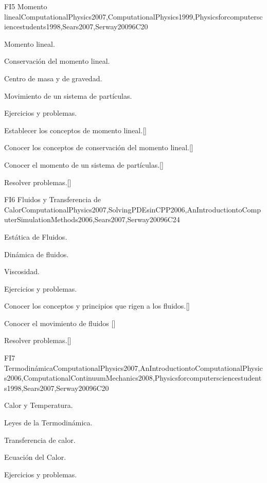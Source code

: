 \begin{syllabus}
\begin{unit}{}{FI5 Momento lineal}{ComputationalPhysics2007,ComputationalPhysics1999,Physicsforcomputersciencestudents1998,Sears2007,Serway2009}{6}{C20}
\begin{topics}
      \item Momento lineal.
      \item Conservación del momento lineal.
      \item Centro de masa y de gravedad.
      \item Movimiento de un sistema de partículas.
      \item Ejercicios y problemas.
  \end{topics}

   \begin{learningoutcomes}
      \item Establecer los conceptos de momento lineal.[\Usage]
      \item Conocer los conceptos de conservación del momento lineal.[\Usage]
      \item Conocer el momento de un sistema de partículas.[\Usage]
      \item Resolver problemas.[\Usage]
   \end{learningoutcomes}
\end{unit}

\begin{unit}{}{FI6 Fluidos y Transferencia de Calor}{ComputationalPhysics2007,SolvingPDEsinCPP2006,AnIntroductiontoComputerSimulationMethods2006,Sears2007,Serway2009}{6}{C24}
\begin{topics}
      \item Estática de Fluidos.
      \item Dinámica de fluidos. 
      \item Viscosidad.
      \item Ejercicios y problemas.
  \end{topics}

   \begin{learningoutcomes}
      \item Conocer los conceptos y principios que rigen a los fluidos.[\Usage]
      \item Conocer el movimiento de fluidos [\Usage]
      \item Resolver problemas.[\Usage]
   \end{learningoutcomes}
\end{unit}

\begin{unit}{}{FI7 Termodinámica}{ComputationalPhysics2007,AnIntroductiontoComputationalPhysics2006,ComputationalContinuumMechanics2008,Physicsforcomputersciencestudents1998,Sears2007,Serway2009}{6}{C20}
\begin{topics}
      \item Calor y Temperatura.
      \item Leyes de la Termodinámica.
      \item Transferencia de calor.
      \item Ecuación del Calor.
      \item Ejercicios y problemas.
  \end{topics}


\end{unit}
\end{syllabus}
